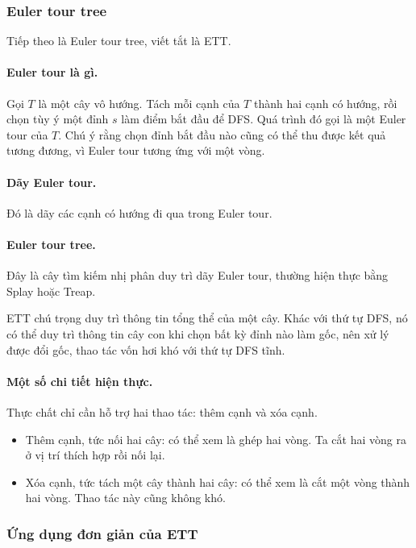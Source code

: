 \documentclass[11pt]{article}
\begin{document}
\subsubsection{Euler tour tree}

Tiếp theo là Euler tour tree, viết tắt là ETT.

\paragraph{Euler tour là gì.}
Gọi \(T\) là một cây vô hướng. Tách mỗi cạnh của \(T\) thành hai cạnh có hướng,
rồi chọn tùy ý một đỉnh \(s\) làm điểm bắt đầu để DFS. Quá trình đó gọi là một
Euler tour của \(T\). Chú ý rằng chọn đỉnh bắt đầu nào cũng có thể thu được kết
quả tương đương, vì Euler tour tương ứng với một vòng.

\paragraph{Dãy Euler tour.}
Đó là dãy các cạnh có hướng đi qua trong Euler tour.

\paragraph{Euler tour tree.}
Đây là cây tìm kiếm nhị phân duy trì dãy Euler tour, thường hiện thực bằng Splay
hoặc Treap.

ETT chú trọng duy trì thông tin tổng thể của một cây. Khác với thứ tự DFS, nó có
thể duy trì thông tin cây con khi chọn bất kỳ đỉnh nào làm gốc, nên xử lý được
đổi gốc, thao tác vốn hơi khó với thứ tự DFS tĩnh.

\paragraph{Một số chi tiết hiện thực.}
Thực chất chỉ cần hỗ trợ hai thao tác: thêm cạnh và xóa cạnh.

\begin{itemize}
  \item Thêm cạnh, tức nối hai cây: có thể xem là ghép hai vòng. Ta cắt hai vòng
  ra ở vị trí thích hợp rồi nối lại.
  \item Xóa cạnh, tức tách một cây thành hai cây: có thể xem là cắt một vòng
  thành hai vòng. Thao tác này cũng không khó.
\end{itemize}

\subsubsection{Ứng dụng đơn giản của ETT}
\end{document}
